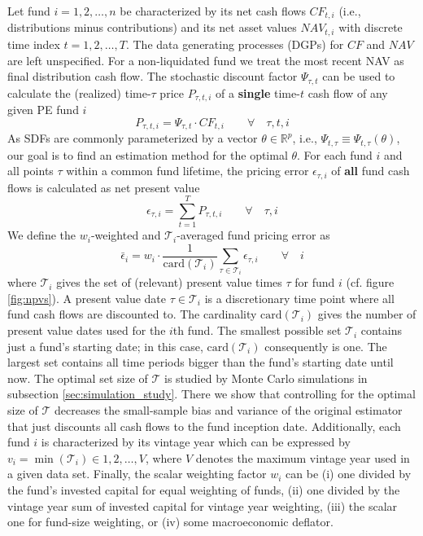 \documentclass[12pt]{article}
\begin{document}
Let fund $i=1,2,\dots,n$ be characterized by its net cash flows ${CF}_{t,i}$ (i.e., distributions minus contributions) and its net asset values ${NAV}_{t,i}$ with discrete time index $t=1,2,\dots,T$.
The data generating processes (DGPs) for $CF$ and $NAV$ are left unspecified.
For a non-liquidated fund we treat the most recent NAV as final distribution cash flow.
The stochastic discount factor $\Psi_{\tau,t}$ can be used to calculate the (realized) time-$\tau$ price $P_{\tau,t,i}$ of a \textbf{single} time-$t$ cash flow of any given PE fund $i$
\begin{equation}
\label{eq:price}
P_{\tau,t,i} = \Psi_{\tau,t} \cdot CF_{t,i}
\qquad \forall \quad \tau,t,i
\end{equation}
As SDFs are commonly parameterized by a vector $\theta \in \mathbb{R}^{p}$, i.e., $\Psi_{t,\tau} \equiv \Psi_{t,\tau} (\theta)$, our goal is to find an estimation method for the optimal $\theta$.
For each fund $i$ and all points $\tau$ within a common fund lifetime, the pricing error $\epsilon_{\tau,i}$ of \textbf{all} fund cash flows is calculated as net present value
\begin{equation}
\label{eq:pricing_error}
\epsilon_{\tau,i} = \sum_{t=1}^T P_{\tau,t,i} 
\qquad \forall \quad \tau,i
\end{equation}
We define the $w_i$-weighted and $\mathcal{T}_i$-averaged fund pricing error as
\begin{equation}
\label{eq:average_pricing_error}
\bar{\epsilon}_{i} =
w_{i} \cdot
\frac{1}{ \mathrm{card}(\mathcal{T}_{i}) }
\sum_{\tau \in \mathcal{T}_{i}}
\epsilon_{\tau,i}
\qquad \forall \quad i
\end{equation}
where $\mathcal{T}_i$ gives the set of (relevant) present value times $\tau$ for fund $i$ (cf. figure \ref{fig:npvs}).
A present value date $\tau \in \mathcal{T}_{i}$ is a discretionary time point where all fund cash flows are discounted to.
The cardinality $\mathrm{card}(\mathcal{T}_{i})$ gives the number of present value dates used for the $i$th fund.
The smallest possible set $\mathcal{T}_i$ contains just a fund's starting date; in this case, $\mathrm{card}(\mathcal{T}_{i})$ consequently is one.
The largest set contains all time periods bigger than the fund's starting date until now.
The optimal set size of $\mathcal{T}$ is studied by Monte Carlo simulations in subsection \ref{sec:simulation_study}.
There we show that controlling for the optimal size of $\mathcal{T}$ decreases the small-sample bias and variance of the original \cite{DLP12} estimator that just discounts all cash flows to the fund inception date.
Additionally, each fund $i$ is characterized by its vintage year which can be expressed by $v_{i}=\min(\mathcal{T}_i) \in 1,2,\dots,V$, where $V$ denotes the maximum vintage year used in a given data set.
Finally, the scalar weighting factor $w_i$ can be (i) one divided by the fund's invested capital for equal weighting of funds, (ii) one divided by the vintage year sum of invested capital for vintage year weighting, (iii) the scalar one for fund-size weighting, or (iv) some macroeconomic deflator.
\end{document}
